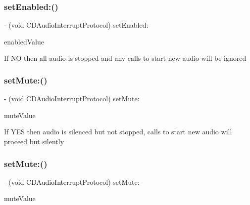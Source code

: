 \subsubsection{\texorpdfstring{set\+Enabled\+:()}{setEnabled:()}\hspace{0.1cm}{\footnotesize\ttfamily [4/4]}}
{\footnotesize\ttfamily -\/ (void C\+D\+Audio\+Interrupt\+Protocol) set\+Enabled\+: \begin{DoxyParamCaption}\item[{(B\+O\+OL)}]{enabled\+Value }\end{DoxyParamCaption}}

If NO then all audio is stopped and any calls to start new audio will be ignored \mbox{\label{protocolCDAudioInterruptProtocol_01-p_aaa4811c33b3720f9d9b014e861211563}} 
\subsubsection{\texorpdfstring{set\+Mute\+:()}{setMute:()}\hspace{0.1cm}{\footnotesize\ttfamily [1/4]}}
{\footnotesize\ttfamily -\/ (void C\+D\+Audio\+Interrupt\+Protocol) set\+Mute\+: \begin{DoxyParamCaption}\item[{(B\+O\+OL)}]{mute\+Value }\end{DoxyParamCaption}}

If Y\+ES then audio is silenced but not stopped, calls to start new audio will proceed but silently \mbox{\label{protocolCDAudioInterruptProtocol_01-p_aaa4811c33b3720f9d9b014e861211563}} 
\subsubsection{\texorpdfstring{set\+Mute\+:()}{setMute:()}\hspace{0.1cm}{\footnotesize\ttfamily [2/4]}}
{\footnotesize\ttfamily -\/ (void C\+D\+Audio\+Interrupt\+Protocol) set\+Mute\+: \begin{DoxyParamCaption}\item[{(B\+O\+OL)}]{mute\+Value }\end{DoxyParamCaption}}

